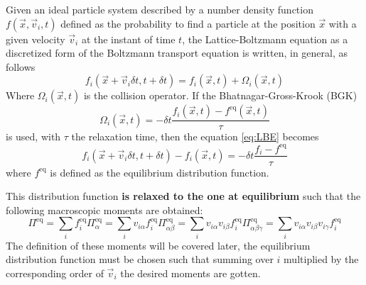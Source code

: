 Given an ideal particle system described by a number density function $f(\vec x, \vec v_i, t)$ defined as the probability to find a particle at the position $\vec x$ with a given velocity $\vec v_i$ at the instant of time $t$, the Lattice-Boltzmann equation as a discretized form of the Boltzmann transport equation is written, in general, as follows
\begin{equation}\label{eq:LBE}
    f_i(\vec x + \vec v_i \delta t, t + \delta t) = f_i(\vec x, t) + \Omega_i(\vec x, t)    
\end{equation}
Where $\Omega_i(\vec x,t)$ is the collision operator. If the Bhatnagar-Gross-Krook (BGK)
\begin{equation}\label{eq:BGK}
    \Omega_i(\vec x,t) = -\delta t\frac{f_i(\vec x, t) - f^{\text{eq}}(\vec x, t)}{\tau}
\end{equation}
is used, with $\tau$ the relaxation time, then the equation \ref{eq:LBE} becomes
\begin{equation}\label{eq:LBE_BGK}
    f_i(\vec x + \vec v_i \delta t, t + \delta t) - f_i(\vec x, t) = -\delta t\frac{f_i - f^{\text{eq}}}{\tau}
\end{equation}
where $f^{\text{eq}}$ is defined as the equilibrium distribution function.

This distribution function \textbf{is relaxed to the one at equilibrium} such that the following macroscopic moments are obtained:
\begin{subequations}\label{eqs:moments}
\begin{equation}
    \Pi^{\text{eq}} = \sum_i f_i^{\text{eq}} \label{eq:moment0}
\end{equation}
\begin{equation}
    \Pi^{\text{eq}}_{\alpha} = \sum_i v_{i\alpha}f_i^{\text{eq}}\label{eq:moment1}
\end{equation}
\begin{equation}
    \Pi^{\text{eq}}_{\alpha\beta} = \sum_i v_{i\alpha}v_{i\beta}f_i^{\text{eq}}\label{eq:moment2}
\end{equation}
\begin{equation}
    \Pi^{\text{eq}}_{\alpha\beta\gamma} = \sum_i v_{i\alpha}v_{i\beta}v_{i\gamma}f_i^{\text{eq}}\label{eq:moment3}
\end{equation}
\end{subequations}
The definition of these moments will be covered later, the equilibrium distribution function must be chosen such that summing over $i$ multiplied by the corresponding order of $\vec v_i$ the desired moments are gotten.


